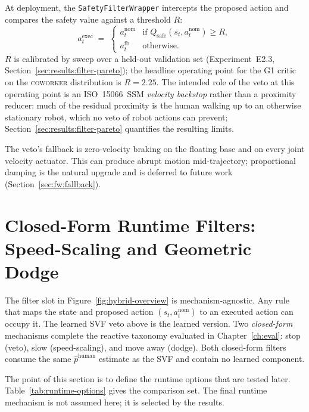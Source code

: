 \documentclass[11pt,a4paper]{report}
\newcommand{\ssm}{SSM}
\newcommand{\iso}{ISO~15066}
\newcommand{\coworker}{\textsc{coworker}}
\begin{document}
At deployment, the \texttt{SafetyFilterWrapper} intercepts the
proposed action and compares the safety value against a threshold
$R$:
\begin{equation}
  a^{\mathrm{exec}}_t \;=\;
  \begin{cases}
    a^{\mathrm{nom}}_t   & \text{if } Q_{\mathrm{safe}}(s_t, a^{\mathrm{nom}}_t) \ge R, \\
    a^{\mathrm{fb}}_t    & \text{otherwise.}
  \end{cases}
  \label{eq:filter-rule}
\end{equation}
$R$ is calibrated by sweep over a held-out validation set
(Experiment~E2.3, Section~\ref{sec:results:filter-pareto}); the
headline operating point for the G1 critic on the \coworker{}
distribution is $R = 2.25$. The intended role of the veto at this
operating point is an \iso{}~\ssm{} \emph{velocity backstop} rather
than a proximity reducer: much of the residual proximity is the
human walking up to an otherwise stationary robot, which no veto of
robot actions can prevent; Section~\ref{sec:results:filter-pareto}
quantifies the resulting limits.

The veto's fallback is zero-velocity braking on the floating base
and on every joint velocity actuator. This can produce abrupt
motion mid-trajectory; proportional damping is the natural upgrade
and is deferred to future work (Section~\ref{sec:fw:fallback}).

\section{Closed-Form Runtime Filters: Speed-Scaling and Geometric Dodge}
\label{sec:method:filter:closedform}

The filter slot in Figure~\ref{fig:hybrid-overview} is
mechanism-agnostic. Any rule that maps the state and proposed action
$(s_t, a^{\mathrm{nom}}_t)$ to an executed action can occupy it. The
learned SVF veto above is the learned version. Two \emph{closed-form}
mechanisms complete the reactive taxonomy evaluated in
Chapter~\ref{ch:eval}: stop (veto), slow (speed-scaling), and move
away (dodge). Both closed-form filters consume the same
$\hat{p}^{\mathrm{human}}$ estimate as the SVF and contain no learned
component.

The point of this section is to define the runtime options that are
tested later. Table~\ref{tab:runtime-options} gives the comparison set.
The final runtime mechanism is not assumed here; it is selected by the
results.
\end{document}
